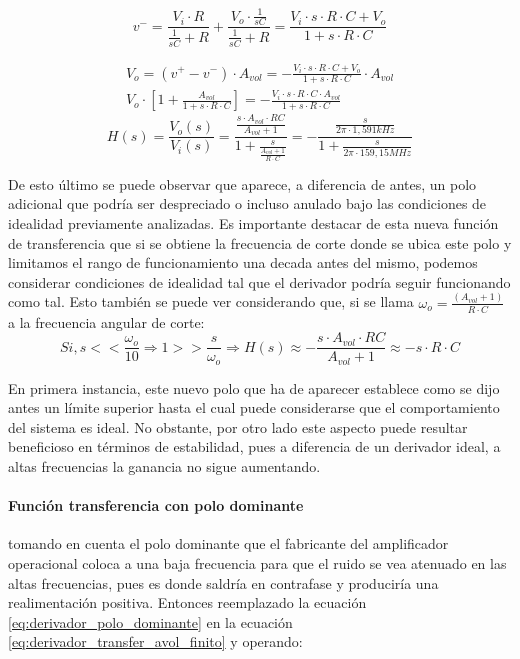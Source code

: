 \begin{equation*}
	v^{-} = \frac{V_i \cdot R}{\frac{1}{sC} + R} + \frac{V_o \cdot \frac{1}{sC}}{\frac{1}{sC} + R}
	= \frac{V_i \cdot s \cdot R \cdot C + V_o}{1 + s \cdot R \cdot C}
\end{equation*}

\begin{align*}
	V_o = (v^{+} - v^{-}) \cdot A_{vol}
	= - \frac{V_i \cdot s \cdot R \cdot C + V_o}{1 + s \cdot R \cdot C} \cdot A_{vol} \\
	V_o \cdot \left[ 1 + \frac{A_{vol}}{1 + s \cdot R \cdot C} \right]
	= - \frac{V_i \cdot s \cdot R \cdot C \cdot A_{vol}}{1 + s \cdot R \cdot C}
\end{align*}
\begin{equation}
	H(s) = \frac{V_o(s)}{V_i(s)} = \frac{\frac{s \cdot A_{vol} \cdot RC}{A_{vol} + 1}}{1 + \frac{s}{\frac{A_{vol} + 1}{R \cdot C}}}
	= - \frac{\frac{s}{2 \pi \cdot 1,591kHz}}{1 + \frac{s}{2 \pi \cdot 159,15MHz}}
	\label{eq:derivador_transfer_avol_finito}
\end{equation}

De esto \'ultimo se puede observar que aparece, a diferencia de antes, un polo adicional que podr\'ia ser despreciado o incluso anulado bajo las condiciones de idealidad previamente analizadas. Es importante destacar de esta nueva funci\'on de transferencia que si se obtiene la frecuencia de corte donde se ubica este polo y limitamos el rango de funcionamiento una decada antes del mismo, podemos considerar condiciones de idealidad tal que el derivador podr\'ia seguir funcionando como tal. Esto tambi\'en se puede ver considerando que, si se llama $\omega_o = \frac{(A_{vol} + 1)}{R \cdot C}$ a la frecuencia angular de corte:
\begin{equation*}
	Si, s << \frac{\omega_o}{10} \Rightarrow 1 >> \frac{s}{\omega_o} \Rightarrow 
	H(s) \approx - \frac{s \cdot A_{vol} \cdot RC}{A_{vol} + 1} \approx
	- s \cdot R \cdot C
\end{equation*}

En primera instancia, este nuevo polo que ha de aparecer establece como se dijo antes un l\'imite superior hasta el
cual puede considerarse que el comportamiento del sistema es ideal. No obstante, por otro lado este aspecto puede resultar beneficioso
en t\'erminos de estabilidad, pues a diferencia de un derivador ideal, a altas frecuencias la ganancia no sigue aumentando.


\paragraph*{Funci\'on transferencia con polo dominante} tomando en cuenta el polo dominante 
que el fabricante del amplificador operacional coloca a una baja frecuencia para 
que el ruido se vea atenuado en las altas frecuencias, pues es donde saldr\'ia en contrafase
y producir\'ia una realimentaci\'on positiva. Entonces reemplazado la ecuaci\'on \ref{eq:derivador_polo_dominante} 
en la ecuaci\'on \ref{eq:derivador_transfer_avol_finito} y operando:

